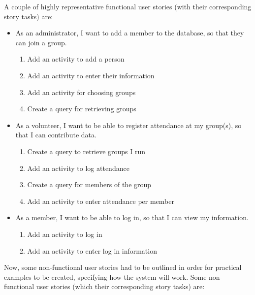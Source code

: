 \documentclass{l3proj}
\begin{document}
A couple of highly representative functional user stories (with their corresponding story tasks) are:
\begin{itemize}

\item As an administrator, I want to add a member to the database, so that they can join a group.

	\begin{enumerate}
	\item Add an activity to add a person
	
	\item Add an activity to enter their information

	\item Add an activity for choosing groups

	\item Create a query for retrieving groups
	\end{enumerate}
\item As a volunteer, I want to be able to register attendance at my group(s), so that I can contribute data.

	\begin{enumerate}
	\item Create a query to retrieve groups I run
	
	\item Add an activity to log attendance
	
	\item Create a query for members of the group
	
	\item Add an activity to enter attendance per member
	
	\end{enumerate}

\item As a member, I want to be able to log in, so that I can view my information.

	\begin{enumerate}
	
	\item Add an activity to log in
	\item Add an activity to enter log in information
	
	\end{enumerate}

\end{itemize}

Now, some non-functional user stories had to be outlined in order for practical examples to be created, specifying how the system will work. Some non-functional user stories (which their corresponding story tasks) are:
\end{document}
